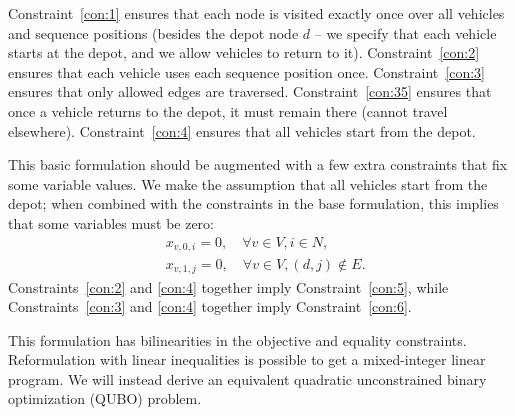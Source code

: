 \documentclass[11pt]{article}
\theoremstyle{definition}
\newcommand{\0}{\mathbf{0}}
\begin{document}
Constraint~\eqref{con:1} ensures that each node is visited exactly once over all vehicles and sequence positions
(besides the depot node $d$ -- we specify that each vehicle starts at the depot, and we allow vehicles to return to it).
Constraint~\eqref{con:2} ensures that each vehicle uses each sequence position once.
Constraint~\eqref{con:3} ensures that only allowed edges are traversed.
Constraint~\eqref{con:35} ensures that once a vehicle returns to the depot, it must remain there (cannot travel elsewhere).
Constraint~\eqref{con:4} ensures that all vehicles start from the depot.

This basic formulation should be augmented with a few extra constraints that fix some variable values.
We make the assumption that all vehicles start from the depot;
when combined with the constraints in the base formulation, this implies that some variables must be zero:
\begin{align}
&\label{con:5}  x_{v,0,i} = 0, \quad \forall v \in V, i \in N, \\
&\label{con:6}  x_{v,1,j} = 0, \quad \forall v \in V, (d,j) \notin E.
\end{align}
Constraints~\eqref{con:2} and \eqref{con:4} together imply Constraint~\eqref{con:5},
while Constraints~\eqref{con:3} and \eqref{con:4} together imply Constraint~\eqref{con:6}.

This formulation has bilinearities in the objective and equality constraints.
Reformulation with linear inequalities is possible to get a mixed-integer linear program.
We will instead derive an equivalent quadratic unconstrained binary optimization (QUBO) problem.
\end{document}
